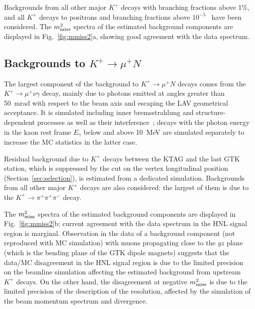 \documentclass[11pt]{article}
\begin{document}

Backgrounds from all other major $K^+$ decays with branching fractions above 1\%, and all $K^+$ decays to positrons and branching fractions above $10^{-5}$~\cite{pdg} have been considered. The $m_{\rm miss}^2$ spectra of the estimated background components are displayed in Fig.~\ref{fig:mmiss2}a, showing good agreement with the data spectrum.


\boldmath
\subsection{Backgrounds to $K^+\to\mu^+N$}
\label{sec:bkg-kmu2}
\unboldmath

The largest component of the background to $K^+\to\mu^+N$ decays comes from the  $K^+\to\mu^+\nu\gamma$ decay, mainly due to photons emitted at angles greater than 50~mrad with respect to the beam axis and escaping the LAV geometrical acceptance. It is simulated including inner bremsstrahlung and structure-dependent processes as well as their interference~\cite{bi92}; decays with the photon energy in the kaon rest frame $E_\gamma$ below and above 10~MeV are simulated separately to increase the MC statistics in the latter case.

Residual background due to $K^+$ decays between the KTAG and the last GTK station, which is suppressed by the cut on the vertex longitudinal position (Section~\ref{sec:selection}), is estimated from a dedicated simulation. Backgrounds from all other major $K^+$ decays are also considered: the largest of them is due to the $K^+\to\pi^+\pi^+\pi^-$ decay.

The $m_{\rm miss}^2$ spectra of the estimated background components are displayed in Fig.~\ref{fig:mmiss2}b; current agreement with the data spectrum in the HNL signal region is marginal. Observation in the data of a background component (not reproduced with MC simulation) with muons propagating close to the $yz$ plane (which is the bending plane of the GTK dipole magnets) suggests that the data/MC disagreement in the HNL signal region is due to the limited precision on the beamline simulation affecting the estimated background from upstream $K^+$ decays. On the other hand, the disagreement at negative $m_{\rm miss}^2$ is due to the limited precision of the description of the resolution, affected by the simulation of the beam momentum spectrum and divergence.
\end{document}
